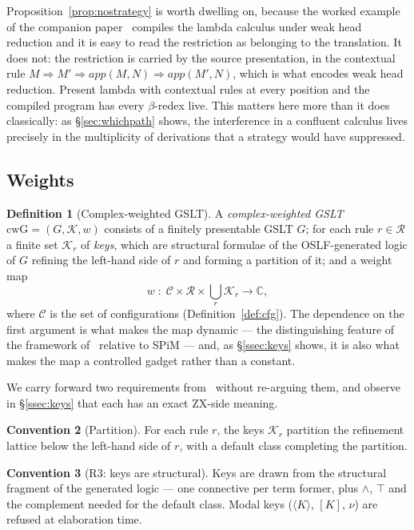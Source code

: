 \documentclass[11pt]{article}
\theoremstyle{definition}
\newtheorem{definition}{Definition}[section]
\newtheorem{convention}[definition]{Convention}
\theoremstyle{plain}
\newcommand{\rew}{\Rightarrow}
\newcommand{\Cfg}{\mathcal{C}}
\newcommand{\cwG}{\mathrm{cwG}}
\begin{document}
Proposition~\ref{prop:nostrategy} is worth dwelling on, because the worked example of the
companion paper~\cite[\S5.1]{optimal} compiles the lambda calculus under weak head reduction
and it is easy to read the restriction as belonging to the translation. It does not: the
restriction is carried by the source presentation, in the contextual rule
$M \rew M' \Rightarrow \mathit{app}(M,N)\rew\mathit{app}(M',N)$, which is what encodes weak head
reduction. Present lambda with contextual rules at every position and the compiled program has
every $\beta$-redex live. This matters here more than it does classically: as
\S\ref{sec:whichpath} shows, the interference in a confluent calculus lives precisely in the
multiplicity of derivations that a strategy would have suppressed.

\subsection{Weights}

\begin{definition}[Complex-weighted GSLT]\label{def:cwg}
A \emph{complex-weighted GSLT} $\cwG = (G, \mathcal{K}, w)$ consists of a finitely presentable
GSLT $G$; for each rule $r \in \mathcal{R}$ a finite set $\mathcal{K}_r$ of \emph{keys}, which
are structural formulae of the OSLF-generated logic of $G$ refining the left-hand side of $r$
and forming a partition of it; and a weight map
\[
  w \;:\; \Cfg \times \mathcal{R} \times \textstyle\bigcup_r \mathcal{K}_r \longrightarrow \mathbb{C},
\]
where $\Cfg$ is the set of configurations (Definition~\ref{def:cfg}). The dependence on the
first argument is what makes the map dynamic --- the distinguishing feature of the framework
of~\cite{weighted} relative to SPiM --- and, as \S\ref{ssec:keys} shows, it is also what makes
the map a controlled gadget rather than a constant.
\end{definition}

We carry forward two requirements from~\cite{weighted} without re-arguing them, and observe in
\S\ref{ssec:keys} that each has an exact ZX-side meaning.

\begin{convention}[Partition]\label{conv:partition}
For each rule $r$, the keys $\mathcal{K}_r$ partition the refinement lattice below the
left-hand side of $r$, with a default class completing the partition.
\end{convention}

\begin{convention}[R3: keys are structural]\label{conv:r3}
Keys are drawn from the structural fragment of the generated logic --- one connective per term
former, plus $\wedge$, $\top$ and the complement needed for the default class. Modal keys
($\langle K \rangle$, $[K]$, $\nu$) are refused at elaboration time.
\end{convention}
\end{document}
